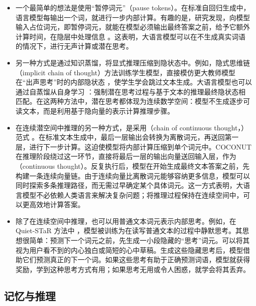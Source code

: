 \begin{itemize}
\item \vspace{0.5cm} 一个最简单的想法是使用“暂停词元”（pause tokens）。在标准自回归生成中，语言模型每输出一个词，就进行一步内部计算。有趣的是，研究发现，向模型输入占位词元，即暂停词元，就能在模型必须输出最终答案之前，给予它额外计算时间，在隐层中处理信息 \cite{goyal-etal:2024think}。这表明，大语言模型可以在不生成真实词语的情况下，进行无声计算或潜在思考。
\item \vspace{0.3cm} 另一种方式是通过知识蒸馏，将显式推理压缩到隐状态中。例如，隐式思维链（implicit chain of thought）方法训练学生模型，直接模仿更大教师模型在“出声思考”时的内部隐状态 \cite{deng-etal:2023implicit}，使学生学会跳过文本生成。大语言模型也可以通过自蒸馏从自身学习 \cite{shen-etal:2025codi}：强制潜在思考过程与基于文本的推理最终隐状态相匹配。在这两种方法中，潜在思考都体现为连续数学空间：模型不生成逐步可读文本，而是利用基于隐向量的表示计算推理步骤。
\item \vspace{0.3cm} 在连续潜空间中推理的另一种方式，是采用（chain of continuous thought，）范式 \cite{hao-etal:2025training}。在标准文本生成中，最后一层输出会转换为离散词元，再送回第一层，进行下一步计算。这迫使模型将内部计算压缩到单个词元中。COCONUT 在推理阶段绕过这一环节，直接将最后一层的输出向量送回输入层，作为（continuous thought）。反复执行后，模型在开始生成最终文本答案之前，先构建一条连续向量链。由于连续向量比离散词元能够容纳更多信息，模型可以同时探索多条推理路径，而无需过早确定某个具体词元。这一方式表明，大语言模型不必依赖人类语言来解决复杂问题；将推理过程保持在连续空间中，可以更高效地计算答案。
\item \vspace{0.3cm} 除了在连续空间中推理，也可以用普通文本词元表示内部思考。例如，在 Quiet-STaR 方法中 \cite{zelikman-etal:2024quietstar}，模型被训练为在读写普通文本的过程中静默思考。其思想很简单：预测下一个词元之前，先生成一小段隐藏的“思考”词元。可以将其视为用户看不到的内心独白或简短的心中草稿。生成这些隐藏思考后，模型借助它们预测真正的下一个词。如果这些思考有助于正确预测词语，模型就获得奖励，学到这种思考方式有用；如果思考无用或令人困惑，就学会将其丢弃。
\end{itemize}
\vspace{0.5cm}

\subsection{记忆与推理}

